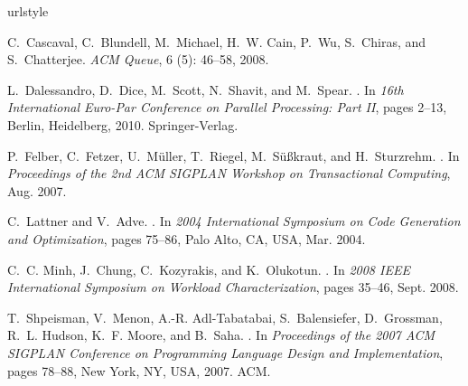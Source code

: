 \documentclass[preprint]{sigplanconf}
\begin{document}
\begin{thebibliography}{10}
\softraggedright
\providecommand{\natexlab}[1]{#1}
\providecommand{\url}[1]{\texttt{#1}}
\expandafter\ifx\csname urlstyle\endcsname\relax
  \providecommand{\doi}[1]{doi: #1}\else
  \providecommand{\doi}{doi: \begingroup \urlstyle{rm}\Url}\fi

C.~Cascaval, C.~Blundell, M.~Michael, H.~W. Cain, P.~Wu, S.~Chiras, and
  S.~Chatterjee.
\newblock \emph{ACM Queue}, 6 (5): 46--58, 2008.

L.~Dalessandro, D.~Dice, M.~Scott, N.~Shavit, and M.~Spear.
.
\newblock In \emph{16th International Euro-Par Conference on Parallel
  Processing: Part II}, pages 2--13, Berlin, Heidelberg, 2010. Springer-Verlag.

P.~Felber, C.~Fetzer, U.~M{\"u}ller, T.~Riegel, M.~S{\"u}{\ss}kraut, and
  H.~Sturzrehm.
.
\newblock In \emph{Proceedings of the 2nd ACM SIGPLAN Workshop on Transactional
  Computing}, Aug. 2007.

C.~Lattner and V.~Adve.
.
\newblock In \emph{2004 International Symposium on Code Generation and
  Optimization}, pages 75--86, Palo Alto, CA, USA, Mar. 2004.

C.~C. Minh, J.~Chung, C.~Kozyrakis, and K.~Olukotun.
.
\newblock In \emph{2008 IEEE International Symposium on Workload
  Characterization}, pages 35--46, Sept. 2008.

T.~Shpeisman, V.~Menon, A.-R. Adl-Tabatabai, S.~Balensiefer, D.~Grossman, R.~L.
  Hudson, K.~F. Moore, and B.~Saha.
.
\newblock In \emph{Proceedings of the 2007 ACM SIGPLAN Conference on
  Programming Language Design and Implementation}, pages 78--88, New York, NY,
  USA, 2007. ACM.


\end{thebibliography}
\end{document}
